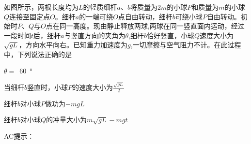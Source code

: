 如图所示，两根长度均为\(L\)的轻质细杆\(a\)、\(b\)将质量为\(2m\)的小球\(P\)和质量为\(m\)的小球\(Q\)连接至固定点\(O\)。细杆\(a\)的一端可绕\(O\)点自由转动，细杆\(b\)可绕小球\(P\)自由转动。初始时\(P\)、\(Q\)与\(O\)点在同一高度。现由静止释放两球,两球在同一竖直面内运动，经过一段时间\(t\)后，细杆\(a\)与竖直方向的夹角为\(\theta\),细杆\(b\)恰好竖直，小球\(Q\)速度大小为\(\sqrt{gL}\)，方向水平向右。已知重力加速度为\(g\),一切摩擦与空气阻力不计。在此过程中，下列说法正确的是\paren[]

\begin{choices}
	\item \(\theta =\) \,\qty{60}{\degree}
	\item 当细杆\(b\)竖直时，小球\(P\)的速度大小为\(\frac{\sqrt{gL}}{2} \)
	\item 细杆\(b\)对小球\(P\)做功为\( - mgL\)
	\item 细杆\(b\)对小球\(Q\)的冲量大小为\(m \sqrt{gL} - mgt\)
\end{choices}
\begin{answer}
	AC\qquad 提示：
\end{answer}